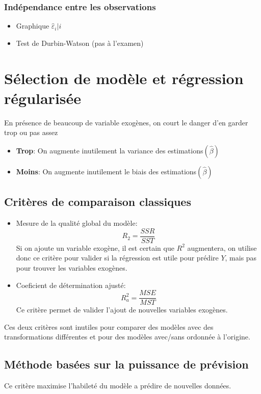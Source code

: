 \documentclass[10pt, french]{article}
\begin{document}
\begin{multicols*}{3}
\subsubsection*{Indépendance entre les observations}
\begin{itemize}
\item Graphique $\hat{\varepsilon}_i | i$
\item Test de Durbin-Watson (pas à l'examen)
\end{itemize}


\section{Sélection de modèle et régression régularisée}
En présence de beaucoup de variable exogènes, on court le danger d'en garder trop ou pas assez
\begin{itemize}
	\item \textbf{Trop}: On augmente inutilement la variance des estimations$(\hat{\beta})$
	\item \textbf{Moins}: On augmente inutilement le biais des estimations$(\hat{\beta})$
\end{itemize}

\subsection*{Critères de comparaison classiques}
\begin{itemize}
	\item Mesure de la qualité global du modèle:
	\[ R_2 = \frac{SSR}{SST} \]
	Si on ajoute un variable exogène, il est certain que $R^2$ augmentera, on utilise donc ce critère pour valider si la régression est utile pour prédire $Y$, mais pas pour trouver les variables exogènes.
	\item Coeficient de détermination ajusté:
	\[ R_a^2 = \frac{MSE}{MST} \]
	Ce critère permet de valider l'ajout de nouvelles variables exogènes.
\end{itemize}
Ces deux critères sont inutiles pour comparer des modèles avec des transformations différentes et pour des modèles avec/sans ordonnée à l'origine.

\subsection*{Méthode basées sur la puissance de prévision}
Ce critère maximise l'habileté du modèle a prédire de nouvelles données.

\end{multicols*}
\end{document}
